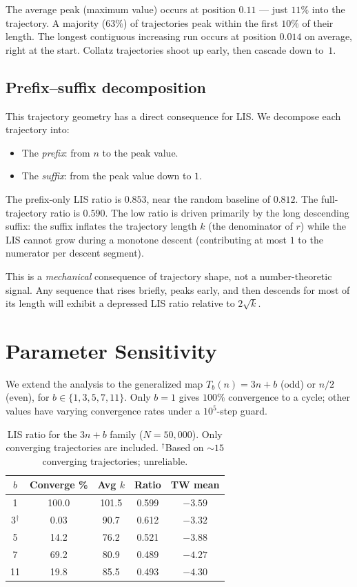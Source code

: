 \documentclass[11pt]{article}
\theoremstyle{definition}
\theoremstyle{remark}
\begin{document}
The average peak (maximum value) occurs at position $0.11$ --- just $11\%$
into the trajectory. A majority ($63\%$) of trajectories peak within the
first $10\%$ of their length. The longest contiguous increasing run occurs
at position $0.014$ on average, right at the start. Collatz trajectories
shoot up early, then cascade down to~$1$.

\subsection{Prefix--suffix decomposition}\label{sec:prefix}

This trajectory geometry has a direct consequence for LIS. We decompose
each trajectory into:
\begin{itemize}
  \item The \emph{prefix}: from $n$ to the peak value.
  \item The \emph{suffix}: from the peak value down to $1$.
\end{itemize}

The prefix-only LIS ratio is $0.853$, near the random baseline of $0.812$.
The full-trajectory ratio is $0.590$. The low ratio is driven primarily by
the long descending suffix: the suffix inflates the trajectory length $k$
(the denominator of $r$) while the LIS cannot grow during a monotone
descent (contributing at most $1$ to the numerator per descent segment).

This is a \emph{mechanical} consequence of trajectory shape, not a
number-theoretic signal. Any sequence that rises briefly, peaks early, and
then descends for most of its length will exhibit a depressed LIS ratio
relative to $2\sqrt{k}$.

\section{Parameter Sensitivity}\label{sec:parameter}

We extend the analysis to the generalized map $T_b(n) = 3n + b$ (odd) or
$n/2$ (even), for $b \in \{1, 3, 5, 7, 11\}$. Only $b = 1$ gives $100\%$
convergence to a cycle; other values have varying convergence rates under a
$10^5$-step guard.

\begin{table}[ht]
\centering
\caption{LIS ratio for the $3n+b$ family ($N = 50{,}000$). Only converging
trajectories are included. $^\dagger$Based on $\sim\!15$ converging
trajectories; unreliable.}
\label{tab:parameter}
\begin{tabular}{@{}ccccc@{}}
\toprule
$b$ & Converge \% & Avg $k$ & Ratio & TW mean \\
\midrule
1   & 100.0 & 101.5 & 0.599 & $-3.59$ \\
3$^\dagger$ & 0.03 & 90.7 & 0.612 & $-3.32$ \\
5   & 14.2  &  76.2 & 0.521 & $-3.88$ \\
7   & 69.2  &  80.9 & 0.489 & $-4.27$ \\
11  & 19.8  &  85.5 & 0.493 & $-4.30$ \\
\bottomrule
\end{tabular}
\end{table}
\end{document}
